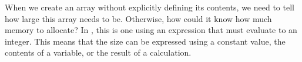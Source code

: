 When we create an array without explicitly defining its contents, we need to tell \csharp how large this array needs to be. Otherwise, how could it know how much memory to allocate? In \csharp, this is one using an expression that must evaluate to an integer. This means that the size can be expressed using a constant value, the contents of a variable, or the result of a calculation. 

